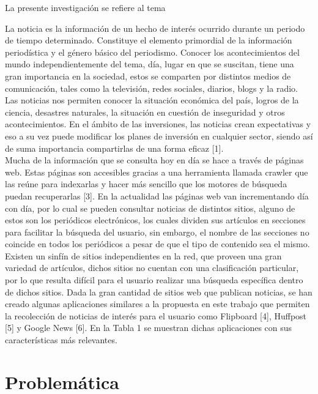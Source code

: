 \documentclass{book}
\begin{document}
La presente investigación se refiere al tema 






La noticia es la información de un hecho de interés ocurrido durante un periodo de tiempo determinado. Constituye el elemento primordial de la información periodística y el género básico del periodismo. Conocer los acontecimientos del mundo independientemente del tema, día, lugar en que se suscitan, tiene una gran importancia en la sociedad, estos se comparten por distintos medios de comunicación, tales como la televisión, redes sociales, diarios, blogs y la radio. Las noticias nos permiten conocer la situación económica del país, logros de la ciencia, desastres naturales, la situación en cuestión de inseguridad y otros acontecimientos. En el ámbito de las inversiones, las noticias crean expectativas y eso a su vez puede modificar los planes de inversión en cualquier sector, siendo así de suma importancia compartirlas de una forma eficaz [1].\\

Mucha de la información que se consulta hoy en día se hace a través de páginas web. Estas páginas son accesibles gracias a una herramienta llamada crawler que las reúne para indexarlas y hacer más sencillo que los motores de búsqueda puedan recuperarlas [3]. En la actualidad las páginas web van incrementando día con día, por lo cual se pueden consultar noticias de distintos sitios, alguno de estos son los periódicos electrónicos, los cuales dividen sus artículos en secciones para facilitar la búsqueda del usuario, sin embargo, el nombre de las secciones no coincide en todos los periódicos a pesar de que el tipo de contenido sea el mismo. Existen un sinfín de sitios independientes en la red, que proveen una gran variedad de artículos, dichos sitios no cuentan con una clasificación particular, por lo que resulta difícil para el usuario realizar una búsqueda específica dentro de dichos sitios.
Dada la gran cantidad de sitios web que publican noticias, se han creado algunas aplicaciones similares a la propuesta en este trabajo que permiten la recolección de noticias de interés para el usuario como Flipboard [4], Huffpost [5] y Google News [6]. En la Tabla 1 se muestran dichas aplicaciones con sus características más relevantes.

\section{Problemática}
\end{document}
